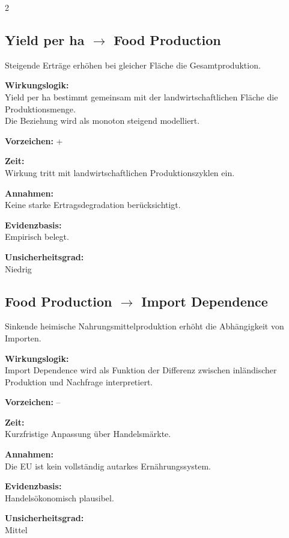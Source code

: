\documentclass[10pt, a4paper]{article}
\begin{document}
\begin{multicols}{2}
\vfill\columnbreak

\subsection*{Yield per ha $\rightarrow$ Food Production}
Steigende Erträge erhöhen bei gleicher Fläche die Gesamtproduktion.

\textbf{Wirkungslogik:}\\
Yield per ha bestimmt gemeinsam mit der landwirtschaftlichen Fläche die Produktionsmenge.\\
Die Beziehung wird als monoton steigend modelliert.

\textbf{Vorzeichen:} +

\textbf{Zeit:}\\
Wirkung tritt mit landwirtschaftlichen Produktionszyklen ein.

\textbf{Annahmen:}\\
Keine starke Ertragsdegradation berücksichtigt.

\textbf{Evidenzbasis:}\\
Empirisch belegt.

\textbf{Unsicherheitsgrad:}\\
Niedrig

\vspace{0.5cm}

\subsection*{Food Production $\rightarrow$ Import Dependence}
Sinkende heimische Nahrungsmittelproduktion erhöht die Abhängigkeit von Importen.

\textbf{Wirkungslogik:}\\
Import Dependence wird als Funktion der Differenz zwischen inländischer Produktion und Nachfrage interpretiert.

\textbf{Vorzeichen:} --

\textbf{Zeit:}\\
Kurzfristige Anpassung über Handelsmärkte.

\textbf{Annahmen:}\\
Die EU ist kein vollständig autarkes Ernährungssystem.

\textbf{Evidenzbasis:}\\
Handelsökonomisch plausibel.

\textbf{Unsicherheitsgrad:}\\
Mittel

\end{multicols}
\newpage
\end{document}
